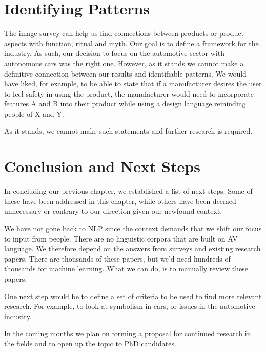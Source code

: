 \documentclass[12pt, usenames, dvipsnames]{report}
\begin{document}
\begin{flushleft}

\section{Identifying Patterns}

The image survey can help us find connections between products or product aspects with function, ritual and myth.
Our goal is to define a framework for the industry. 
As such, our decision to focus on the automotive sector with autonomous cars was the right one. 
However, as it stands we cannot make a definitive connection between our results and identifiable patterns.
We would have liked, for example, to be able to state that if a manufacturer desires the user to feel safety in using the product, the manufacturer would need to incorporate features A and B into their product while using a design language reminding people of X and Y.

As it stands, we cannot make such statements and further research is required.


\section{Conclusion and Next Steps}

In concluding our previous chapter, we established a list of next steps. 
Some of these have been addressed in this chapter, while others have been deemed unnecessary or contrary to our direction given our newfound context.

We have not gone back to NLP since the context demands that we shift our focus to input from people.
There are no linguistic corpora that are built on AV language. 
We therefore depend on the answers from surveys and existing research papers. 
There are thousands of these papers, but we'd need hundreds of thousands for machine learning.
What we can do, is to manually review these papers.

One next step would be to define a set of criteria to be used to find more relevant research. 
For example, to look at symbolism in cars, or issues in the automotive industry.

In the coming months we plan on forming a proposal for continued research in the fields and to open up the topic to PhD candidates.





\end{flushleft}
\end{document}
